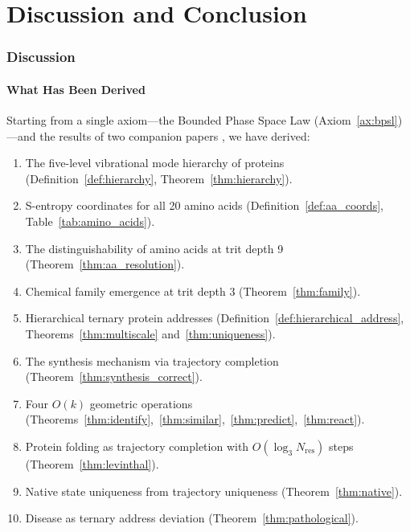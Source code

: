 \documentclass[11pt,twocolumn,a4paper]{article}
\theoremstyle{definition}
\theoremstyle{remark}
\newcommand{\Nres}{N_{\mathrm{res}}}
\begin{document}

\part{Discussion and Conclusion}

\section{Discussion}
\label{sec:discussion}

\subsection{What Has Been Derived}

Starting from a single axiom---the Bounded Phase Space Law (Axiom~\ref{ax:bpsl})---and the results of two companion papers \citep{sachikonye2025a, sachikonye2025b}, we have derived:

\begin{enumerate}[nosep]
\item The five-level vibrational mode hierarchy of proteins (Definition~\ref{def:hierarchy}, Theorem~\ref{thm:hierarchy}).
\item S-entropy coordinates for all 20 amino acids (Definition~\ref{def:aa_coords}, Table~\ref{tab:amino_acids}).
\item The distinguishability of amino acids at trit depth 9 (Theorem~\ref{thm:aa_resolution}).
\item Chemical family emergence at trit depth 3 (Theorem~\ref{thm:family}).
\item Hierarchical ternary protein addresses (Definition~\ref{def:hierarchical_address}, Theorems~\ref{thm:multiscale} and~\ref{thm:uniqueness}).
\item The synthesis mechanism via trajectory completion (Theorem~\ref{thm:synthesis_correct}).
\item Four $O(k)$ geometric operations (Theorems~\ref{thm:identify},~\ref{thm:similar},~\ref{thm:predict},~\ref{thm:react}).
\item Protein folding as trajectory completion with $O(\log_3 \Nres)$ steps (Theorem~\ref{thm:levinthal}).
\item Native state uniqueness from trajectory uniqueness (Theorem~\ref{thm:native}).
\item Disease as ternary address deviation (Theorem~\ref{thm:pathological}).
\end{enumerate}
\end{document}
